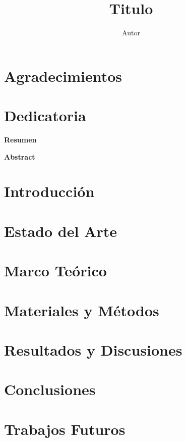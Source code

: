 \documentclass[12pt,a4paper]{report}
\author{Autor}
\title{Titulo}
\begin{document}

\chapter*{Agradecimientos}
\chapter*{Dedicatoria}
\tableofcontents
\listoffigures
\listoftables
\newpage
{}
\begin{flushleft}
\large\textbf{Resumen}
\end{flushleft}

\begin{flushleft}
\large\textbf{Abstract}
\end{flushleft}
\chapter{Introducción}


\chapter{Estado del Arte}


\chapter{Marco Teórico}


\chapter{Materiales y Métodos}


\chapter{Resultados y Discusiones}


\chapter{Conclusiones}


\chapter{Trabajos Futuros}


\printbibliography[heading=bibintoc,title={Bibliografia}]

\appendix
\chapter{}

\end{document}
